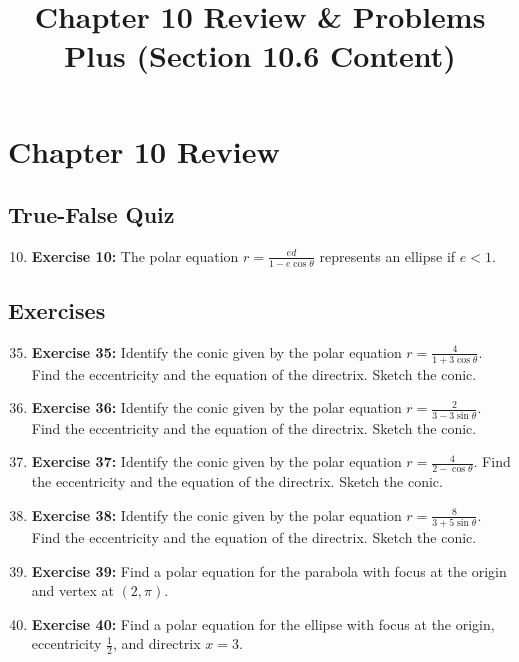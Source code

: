 \documentclass[12pt, a4paper]{article}
\title{Chapter 10 Review \& Problems Plus (Section 10.6 Content)}
\author{}
\date{}
\begin{document}
\maketitle
\hrulefill
\vspace{1em}

\section*{Chapter 10 Review}

\subsection*{True-False Quiz}
\begin{enumerate}
    \setcounter{enumi}{9}
    \item \textbf{Exercise 10:} The polar equation $r = \frac{ed}{1 - e\cos\theta}$ represents an ellipse if $e < 1$.
\end{enumerate}

\subsection*{Exercises}
\begin{enumerate}
    \setcounter{enumi}{34}
    \item \textbf{Exercise 35:} Identify the conic given by the polar equation $r = \frac{4}{1+3\cos\theta}$. Find the eccentricity and the equation of the directrix. Sketch the conic.
    
    \item \textbf{Exercise 36:} Identify the conic given by the polar equation $r = \frac{2}{3-3\sin\theta}$. Find the eccentricity and the equation of the directrix. Sketch the conic.
    
    \item \textbf{Exercise 37:} Identify the conic given by the polar equation $r = \frac{4}{2-\cos\theta}$. Find the eccentricity and the equation of the directrix. Sketch the conic.

    \item \textbf{Exercise 38:} Identify the conic given by the polar equation $r = \frac{8}{3+5\sin\theta}$. Find the eccentricity and the equation of the directrix. Sketch the conic.
    
    \item \textbf{Exercise 39:} Find a polar equation for the parabola with focus at the origin and vertex at $(2, \pi)$.
    
    \item \textbf{Exercise 40:} Find a polar equation for the ellipse with focus at the origin, eccentricity $\frac{1}{2}$, and directrix $x=3$.
\end{enumerate}
\end{document}
